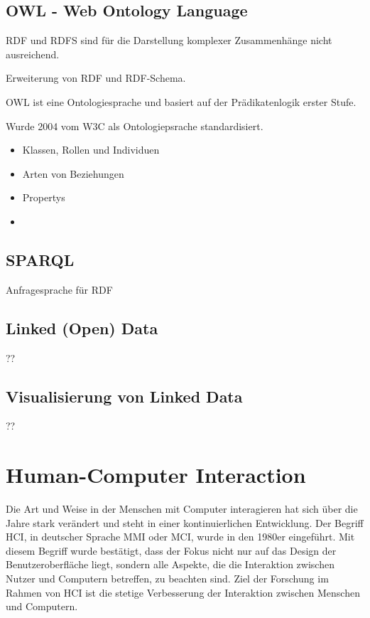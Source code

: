 \subsection{OWL - Web Ontology Language}

RDF und RDFS sind für die Darstellung komplexer Zusammenhänge nicht ausreichend.

Erweiterung von RDF und RDF-Schema. 

OWL ist eine Ontologiesprache und basiert auf der Prädikatenlogik erster Stufe.

Wurde 2004 vom W3C als Ontologiepsrache standardisiert.

\begin{itemize}
	\item Klassen, Rollen und Individuen
	\item Arten von Beziehungen
	\item Propertys
	\item 
\end{itemize}

\subsection{SPARQL} 

Anfragesprache für RDF

\subsection{Linked (Open) Data} ??

\subsection{Visualisierung von Linked Data} ??

\section{Human-Computer Interaction}\label{sec:ux}

Die Art und Weise in der Menschen mit Computer interagieren hat sich über die Jahre stark verändert und steht in einer kontinuierlichen Entwicklung. 
Der Begriff  \ac{HCI}, in deutscher Sprache \ac{MMI} oder \ac{MCI}, wurde in den 1980er eingeführt.
Mit diesem Begriff wurde bestätigt, dass der Fokus nicht nur auf das Design der Benutzeroberfläche liegt, sondern alle Aspekte, die die Interaktion zwischen Nutzer und Computern betreffen, zu beachten sind. \citep[vgl.]{preece_human-computer_1995}
Ziel der Forschung im Rahmen von \ac{HCI} ist die stetige Verbesserung der Interaktion zwischen Menschen und Computern. \newline

